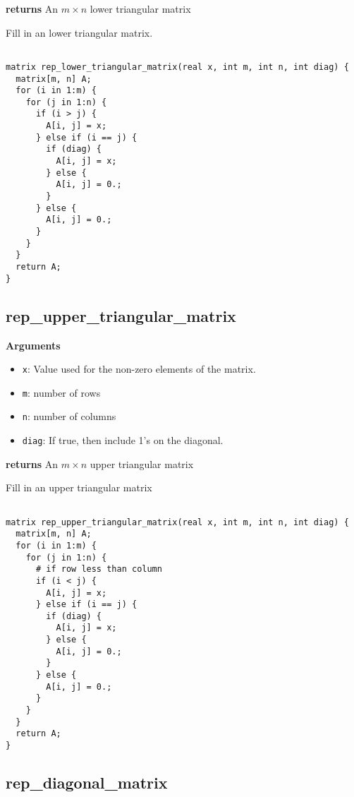 \documentclass[]{book}
\providecommand{\tightlist}{%
  \setlength{\itemsep}{0pt}\setlength{\parskip}{0pt}}
\begin{document}
\textbf{returns} An \(m \times n\) lower triangular matrix

Fill in an lower triangular matrix.

\begin{verbatim}

matrix rep_lower_triangular_matrix(real x, int m, int n, int diag) {
  matrix[m, n] A;
  for (i in 1:m) {
    for (j in 1:n) {
      if (i > j) {
        A[i, j] = x;
      } else if (i == j) {
        if (diag) {
          A[i, j] = x;
        } else {
          A[i, j] = 0.;
        }
      } else {
        A[i, j] = 0.;
      }
    }
  }
  return A;
}

\end{verbatim}

\subsection{rep\_upper\_triangular\_matrix}\label{rep_upper_triangular_matrix}

\textbf{Arguments}

\begin{itemize}
\tightlist
\item
  \texttt{x}: Value used for the non-zero elements of the matrix.
\item
  \texttt{m}: number of rows
\item
  \texttt{n}: number of columns
\item
  \texttt{diag}: If true, then include 1's on the diagonal.
\end{itemize}

\textbf{returns} An \(m \times n\) upper triangular matrix

Fill in an upper triangular matrix

\begin{verbatim}

matrix rep_upper_triangular_matrix(real x, int m, int n, int diag) {
  matrix[m, n] A;
  for (i in 1:m) {
    for (j in 1:n) {
      # if row less than column
      if (i < j) {
        A[i, j] = x;
      } else if (i == j) {
        if (diag) {
          A[i, j] = x;
        } else {
          A[i, j] = 0.;
        }
      } else {
        A[i, j] = 0.;
      }
    }
  }
  return A;
}

\end{verbatim}

\subsection{rep\_diagonal\_matrix}\label{rep_diagonal_matrix}
\end{document}
